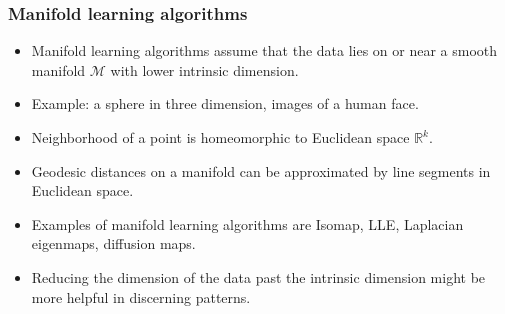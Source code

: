 \documentclass[professionalfonts, hyperref={pdfpagelabels=false,
  colorlinks=true, linkcolor=purple}]{beamer}
\begin{document}
\begin{frame}
  \frametitle{Manifold learning algorithms}
  \begin{itemize}
  \item Manifold learning algorithms assume that the data lies on or
    near a smooth manifold $\mathcal{M}$ with lower intrinsic
    dimension. 
  \item Example: a sphere in three dimension, images of a human face.  
  \item Neighborhood of a point is homeomorphic to Euclidean space
    $\mathbb{R}^{k}$.  
  \item Geodesic distances on a manifold can be approximated by
    line segments in Euclidean space. 
  \item Examples of manifold learning algorithms are Isomap, LLE,
    Laplacian eigenmaps, diffusion maps.
  \item Reducing the dimension of the data past the intrinsic
    dimension might be more helpful in discerning patterns. 
  \end{itemize}
\end{frame}
\end{document}
